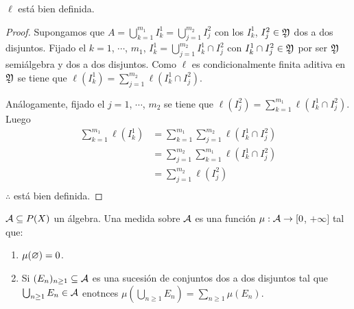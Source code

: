 \begin{prop}
    $\ell$ está bien definida.

    \begin{proof}
        Supongamos que $A = \bigcup_{k = 1}^{m_1} I_k^1 = \bigcup_{j = 1}^{m_2} I_j^2$ con los $I_k^1$, $I_j^2 \in \mathfrak{Y}$ dos a dos disjuntos.
        Fijado el $k = 1$, $\cdots$, $m_1$, $I_k^1 = \bigcup_{j = 1}^{m_2} I_k^1 \cap I_j^2$ con $I_k^1 \cap I_j^2 \in \mathfrak{Y}$ por ser $\mathfrak{Y}$ semiálgebra y dos a dos disjuntos.
        Como $\ell$ es condicionalmente finita aditiva en $\mathfrak{Y}$ se tiene que $\ell(I_k^1) = \sum_{j = 1}^{m_2} \ell(I_k^1 \cap I_j^2)$.

        Análogamente, fijado el $j = 1$, $\cdots$, $m_2$ se tiene que $\ell(I_j^2) = \sum_{k = 1}^{m_1} \ell(I_k^1 \cap I_j^2)$.
        Luego \begin{align*}
            \sum_{k = 1}^{m_1} \ell(I_k^1) & = \sum_{k = 1}^{m_1} \sum_{j = 1}^{m_2} \ell(I_k^1 \cap I_j^2) \\
                                           & = \sum_{j = 1}^{m_2} \sum_{k = 1}^{m_1}\ell(I_k^1 \cap I_j^2)  \\
                                           & = \sum_{j = 1}^{m_2} \ell(I_j^2)                               \\
        \end{align*}
        $\therefore$ está bien definida.
    \end{proof}
\end{prop}

\begin{definition}
    $\mathcal{A} \subseteq P(X)$ un álgebra. Una medida sobre $\mathcal{A}$ es una función $\mu : \mathcal{A} \to [0$, $+\infty]$ tal que: \begin{enumerate}
        \item $\mu(\varnothing) = 0$.
        \item Si $(E_n)_{n \geq 1} \subseteq \mathcal{A}$ es una sucesión de conjuntos dos a dos disjuntos tal que $\bigcup_{n \geq 1} E_n \in \mathcal{A}$ enotnces
              $\mu(\bigcup_{n \geq 1} E_n) = \sum_{n \geq 1} \mu(E_n)$.
    \end{enumerate}
\end{definition}

\clearpage

